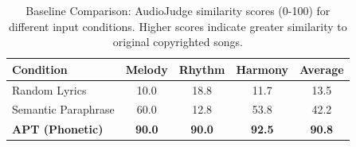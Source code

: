 
\begin{table}[t]
\centering
\caption{Baseline Comparison: AudioJudge similarity scores (0-100) for different input conditions. Higher scores indicate greater similarity to original copyrighted songs.}
\label{tab:baseline-comparison}
\begin{tabular}{lcccc}
\toprule
\textbf{Condition} & \textbf{Melody} & \textbf{Rhythm} & \textbf{Harmony} & \textbf{Average} \\
\midrule
Random Lyrics & 10.0 & 18.8 & 11.7 & 13.5 \\
Semantic Paraphrase & 60.0 & 12.8 & 53.8 & 42.2 \\
\textbf{APT (Phonetic)} & \textbf{90.0} & \textbf{90.0} & \textbf{92.5} & \textbf{90.8} \\
\bottomrule
\end{tabular}
\end{table}
